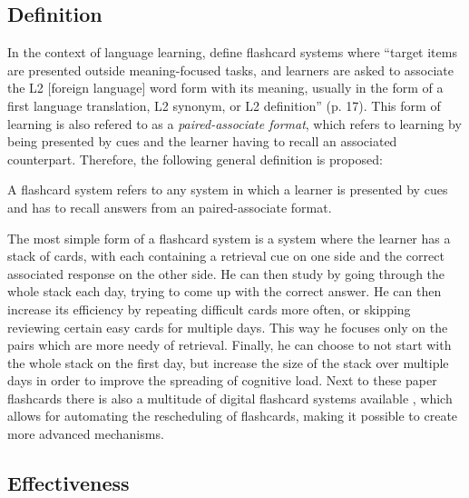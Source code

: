 \subsection{Definition}

In the context of language learning,  define flashcard systems where ``target items are presented outside meaning-focused tasks, and learners are asked to associate the L2 [foreign language] word form with its meaning, usually in the form of a first language translation, L2 synonym, or L2 definition'' (p. 17). This form of learning is also refered to as a \emph{paired-associate format}, which refers to learning by being presented by cues and the learner having to recall an associated counterpart. Therefore, the following general definition is proposed:

\begin{definition}
    A flashcard system refers to any system in which a learner is presented by cues and has to recall answers from an paired-associate format.
\end{definition}

The most simple form of a flashcard system is a system where the learner has a stack of cards, with each containing a retrieval cue on one side and the correct associated response on the other side. He can then study by going through the whole stack each day, trying to come up with the correct answer. He can then increase its efficiency by repeating difficult cards more often, or skipping reviewing certain easy cards for multiple days. This way he focuses only on the pairs which are more needy of retrieval. Finally, he can choose to not start with the whole stack on the first day, but increase the size of the stack over multiple days in order to improve the spreading of cognitive load. Next to these paper flashcards there is also a multitude of digital flashcard systems available \cite{hwang2, nakata, microlearning}, which allows for automating the rescheduling of flashcards, making it possible to create more advanced mechanisms.

\subsection{Effectiveness}

